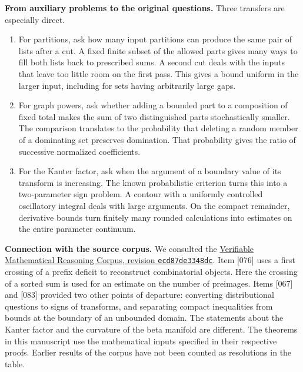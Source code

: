 \documentclass[11pt,a4paper]{article}
\numberwithin{equation}{section}
\begin{document}
\clearpage
\noindent\textbf{From auxiliary problems to the original questions.}
Three transfers are especially direct.
\begin{enumerate}
\item For partitions, ask how many input partitions can produce the same
pair of lists after a cut. A fixed finite subset of the allowed parts
gives many ways to fill both lists back to prescribed sums. A second
cut deals with the inputs that leave too little room on the first pass.
This gives a bound uniform in the larger input, including for sets
having arbitrarily large gaps.
\item For graph powers, ask whether adding a bounded part to a
composition of fixed total makes the sum of two distinguished parts
stochastically smaller. The comparison translates to the probability
that deleting a random member of a dominating set preserves domination.
That probability gives the ratio of successive normalized coefficients.
\item For the Kanter factor, ask when the argument of a boundary
value of its transform is increasing. The known probabilistic
criterion turns this into a two-parameter sign problem. A contour with
a uniformly controlled oscillatory integral deals with large arguments.
On the compact remainder, derivative bounds turn finitely many rounded
calculations into estimates on the entire parameter continuum.
\end{enumerate}

\noindent\textbf{Connection with the source corpus.}
We consulted the
\href{https://github.com/QEEDDD/Verifiable-Mathematical-Reasoning-Corpus/commit/ecd87de3348dcb706a76bb12fde722d7a348a012}{Verifiable Mathematical Reasoning Corpus, revision \texttt{ecd87de3348dc}}.
Item [076] uses a first crossing of a prefix deficit to reconstruct
combinatorial objects. Here the crossing of a sorted sum is used for
an estimate on the number of preimages. Items [067] and [083] provided
two other points of departure: converting distributional questions to
signs of transforms, and separating compact inequalities from bounds
at the boundary of an unbounded domain. The statements about the
Kanter factor and the curvature of the beta manifold are different.
The theorems in this manuscript use the mathematical inputs specified
in their respective proofs. Earlier results of the corpus have not been
counted as resolutions in the table.
\end{document}

